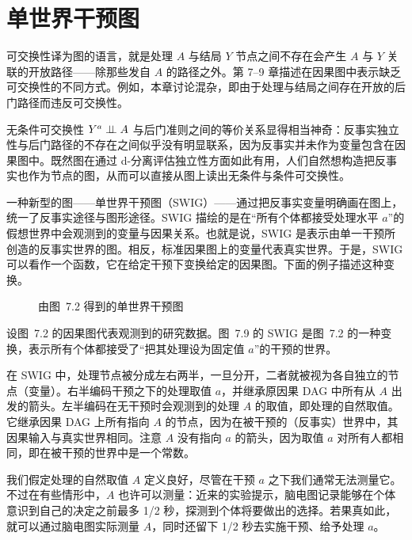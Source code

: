 \section{单世界干预图}

可交换性译为图的语言，就是处理 $A$ 与结局 $Y$ 节点之间不存在会产生 $A$ 与 $Y$ 关联的开放路径——除那些发自 $A$ 的路径之外。第 7–9 章描述在因果图中表示缺乏可交换性的不同方式。例如，本章讨论混杂，即由于处理与结局之间存在开放的后门路径而违反可交换性。

无条件可交换性 $Y^{a}\perp\!\!\!\perp A$ 与后门准则之间的等价关系显得相当神奇：反事实独立性与后门路径的不存在之间似乎没有明显联系，因为反事实并未作为变量包含在因果图中。既然图在通过 d-分离评估独立性方面如此有用，人们自然想构造把反事实也作为节点的图，从而可以直接从图上读出无条件与条件可交换性。

一种新型的图——单世界干预图（SWIG）——通过把反事实变量明确画在图上，统一了反事实途径与图形途径。SWIG 描绘的是在“所有个体都接受处理水平 $a$”的假想世界中会观测到的变量与因果关系。也就是说，SWIG 是表示由单一干预所创造的反事实世界的图。相反，标准因果图上的变量代表真实世界。于是，SWIG 可以看作一个函数，它在给定干预下变换给定的因果图。下面的例子描述这种变换。

\begin{figure}[htbp]
\centering
{}
\caption{由图~7.2 得到的单世界干预图}
\label{fig:7.9}
\end{figure}

设图~7.2 的因果图代表观测到的研究数据。图~7.9 的 SWIG 是图~7.2 的一种变换，表示所有个体都接受了“把其处理设为固定值 $a$”的干预的世界。

在 SWIG 中，处理节点被分成左右两半，一旦分开，二者就被视为各自独立的节点（变量）。右半编码干预之下的处理取值 $a$，并继承原因果 DAG 中所有从 $A$ 出发的箭头。左半编码在无干预时会观测到的处理 $A$ 的取值，即处理的自然取值。它继承因果 DAG 上所有指向 $A$ 的节点，因为在被干预的（反事实）世界中，其因果输入与真实世界相同。注意 $A$ 没有指向 $a$ 的箭头，因为取值 $a$ 对所有人都相同，即在被干预的世界中是一个常数。

我们假定处理的自然取值 $A$ 定义良好，尽管在干预 $a$ 之下我们通常无法测量它。不过在有些情形中，$A$ 也许可以测量：近来的实验提示，脑电图记录能够在个体意识到自己的决定之前最多 1/2 秒，探测到个体将要做出的选择。若果真如此，就可以通过脑电图实际测量 $A$，同时还留下 1/2 秒去实施干预、给予处理 $a$。

